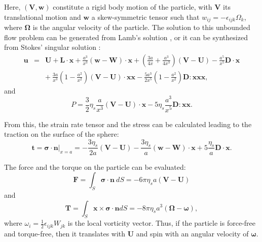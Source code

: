 \documentclass[english,fleqn,allpages]{ISTE_science}[2018/07/30]
\begin{document}
Here, $\left(\mathbf{V},\mathbf{w}\right)$ constitute a rigid body
motion of the particle, with $\mathbf{V}$ its translational motion
and $\mathbf{w}$ a skew-symmetric tensor such that $w_{ij}=-\epsilon_{ijk}\Omega_{k}$,
where $\mathbf{\Omega}$ is the angular velocity of the particle.
The solution to this unbounded flow problem can be generated from
Lamb's solution \cite{happel73}, or it can be synthesized from Stokes'
singular solution \cite{phan-thien94}: 
\begin{eqnarray}
\mathbf{u} & =&\mathbf{U}+\mathbf{L}\cdot\mathbf{x}+\frac{a^{3}}{x^{3}}\left(\mathbf{w}-\mathbf{W}\right)\cdot\mathbf{x}+\left(\frac{3a}{4x}+\frac{a^{3}}{4x^{3}}\right)(\mathbf{V}-\mathbf{U})-\frac{a^{5}}{x^{5}}\mathbf{D}\cdot\mathbf{x}\nonumber \\
& & +\ \frac{3a}{x^{3}}\left(1-\frac{a^{2}}{x^{2}}\right)(\mathbf{V}-\mathbf{U})\cdot\mathbf{xx}-\frac{5a^{3}}{2x^{5}}\left(1-\frac{a^{2}}{x^{2}}\right)\mathbf{D}:\mathbf{xxx},\label{sphere-sol}
\end{eqnarray}
and 
\begin{equation}
P=\frac{3}{2}\eta_{s}\frac{a}{x^{3}}(\mathbf{V}-\mathbf{U})\cdot\mathbf{x}-5\eta_{s}\frac{a^{3}}{x^{5}}\mathbf{D}:\mathbf{xx}.
\end{equation}

From this, the strain rate tensor and the stress can be calculated
leading to the traction on the surface of the sphere: 
\begin{equation}
\mathbf{t}=\mathbf{\sigma}\cdot\mathbf{n}|_{x=a}=-\frac{3\eta_{s}}{2a}(\mathbf{V}-\mathbf{U})-\frac{3\eta_{s}}{a}(\mathbf{w}-\mathbf{W})\cdot\mathbf{x}+5\frac{\eta_{s}}{a}\mathbf{D}\cdot\mathbf{x}.\label{traction}
\end{equation}

The force and the torque on the particle can be evaluated: 
\begin{equation}
\mathbf{F}=\int_{S}\mathbf{\sigma}\cdot\mathbf{n}\ dS=-6\pi\eta_{s}a(\mathbf{V}-\mathbf{U})
\end{equation}
and 
\begin{equation}
\mathbf{T}=\int_{S}\mathbf{x}\times\mathbf{\sigma}\cdot\mathbf{n}dS=-8\pi\eta_{s}a^{3}(\mathbf{\Omega}-\mathbf{\omega}),
\end{equation}
where $\omega_{i}=\frac{1}{2}\epsilon_{ijk}W_{jk}$ is the local vorticity
vector. Thus, if the particle is force-free and torque-free, then
it translates with $\mathbf{U}$ and spin with an angular velocity
of $\mathbf{\omega}$.
\end{document}
